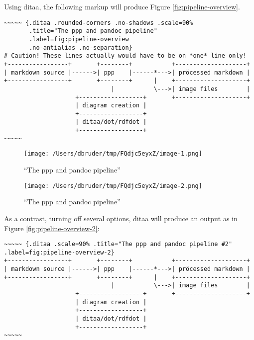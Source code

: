 \documentclass[]{article}
\begin{document}
Using ditaa, the following markup will produce Figure
\ref{fig:pipeline-overview}.

\scriptsize

\begin{verbatim}
~~~~~ {.ditaa .rounded-corners .no-shadows .scale=90%
       .title="The ppp and pandoc pipeline"
       .label=fig:pipeline-overview 
       .no-antialias .no-separation}
# Caution! These lines actually would have to be on *one* line only!
+-----------------+       +--------+           +--------------------+
| markdown source |------>| ppp    |------*--->| pröcessed markdown |
+-----------------+       +--------+      |    +--------------------+
                              |           \--->| image files        |
                    +------------------+       +--------------------+
                    | diagram creation |
                    +------------------+
                    | ditaa/dot/rdfdot |
                    +------------------+
~~~~~
\end{verbatim}

\normalsize

\begin{figure}[htbp]
\centering
\texttt{[image: /Users/dbruder/tmp/FQdjc5eyxZ/image-1.png]}
\caption{``The ppp and pandoc pipeline''\label{fig:pipeline-overview-x}}
\end{figure}

\begin{figure}[htbp]
\centering
\texttt{[image: /Users/dbruder/tmp/FQdjc5eyxZ/image-2.png]}
\caption{``The ppp and pandoc pipeline''\label{fig:pipeline-overview-y}}
\end{figure}

As a contrast, turning off several options, ditaa will produce an output
as in Figure \ref{fig:pipeline-overview-2}:

\scriptsize

\begin{verbatim}
~~~~~ {.ditaa .scale=90% .title="The ppp and pandoc pipeline #2" .label=fig:pipeline-overview-2}
+-----------------+       +--------+           +--------------------+
| markdown source |------>| ppp    |------*--->| pröcessed markdown |
+-----------------+       +--------+      |    +--------------------+
                              |           \--->| image files        |
                    +------------------+       +--------------------+
                    | diagram creation |
                    +------------------+
                    | ditaa/dot/rdfdot |
                    +------------------+
~~~~~
\end{verbatim}
\end{document}
